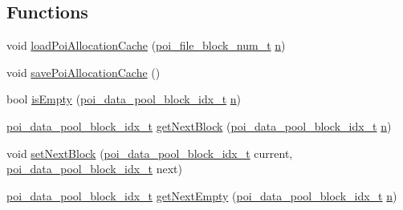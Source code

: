 \subsection*{Functions}
\begin{DoxyCompactItemize}
\item 
void \hyperlink{allocation-block-manager_8h_a2d77f886ffa0a0d025a6a521cc6cf294}{load\-Poi\-Allocation\-Cache} (\hyperlink{file-manager_8h_aef709af8fc6566dcaf55b656bb9f8881}{poi\-\_\-file\-\_\-block\-\_\-num\-\_\-t} \hyperlink{allocation-table-test_8c_a24010dade8ebab3f87a48022772cd975}{n})
\item 
void \hyperlink{allocation-block-manager_8h_aa62c7923af0be489b52b1dcdd7c04e23}{save\-Poi\-Allocation\-Cache} ()
\item 
bool \hyperlink{allocation-block-manager_8h_a4b553c2a61827a60738c9323e6082903}{is\-Empty} (\hyperlink{data-pool-block-manager_8h_a87e19ab8290bcd76be1c7db1e90cc6f6}{poi\-\_\-data\-\_\-pool\-\_\-block\-\_\-idx\-\_\-t} \hyperlink{allocation-table-test_8c_a24010dade8ebab3f87a48022772cd975}{n})
\item 
\hyperlink{data-pool-block-manager_8h_a87e19ab8290bcd76be1c7db1e90cc6f6}{poi\-\_\-data\-\_\-pool\-\_\-block\-\_\-idx\-\_\-t} \hyperlink{allocation-block-manager_8h_a0843a74a7e1cc7c50dbfa521e4ea1cc8}{get\-Next\-Block} (\hyperlink{data-pool-block-manager_8h_a87e19ab8290bcd76be1c7db1e90cc6f6}{poi\-\_\-data\-\_\-pool\-\_\-block\-\_\-idx\-\_\-t} \hyperlink{allocation-table-test_8c_a24010dade8ebab3f87a48022772cd975}{n})
\item 
void \hyperlink{allocation-block-manager_8h_a7387272862663d2af1af9d5c21cddc84}{set\-Next\-Block} (\hyperlink{data-pool-block-manager_8h_a87e19ab8290bcd76be1c7db1e90cc6f6}{poi\-\_\-data\-\_\-pool\-\_\-block\-\_\-idx\-\_\-t} current, \hyperlink{data-pool-block-manager_8h_a87e19ab8290bcd76be1c7db1e90cc6f6}{poi\-\_\-data\-\_\-pool\-\_\-block\-\_\-idx\-\_\-t} next)
\item 
\hyperlink{data-pool-block-manager_8h_a87e19ab8290bcd76be1c7db1e90cc6f6}{poi\-\_\-data\-\_\-pool\-\_\-block\-\_\-idx\-\_\-t} \hyperlink{allocation-block-manager_8h_ab352dc84382d70f0044e92c52165c2cc}{get\-Next\-Empty} (\hyperlink{data-pool-block-manager_8h_a87e19ab8290bcd76be1c7db1e90cc6f6}{poi\-\_\-data\-\_\-pool\-\_\-block\-\_\-idx\-\_\-t} \hyperlink{allocation-table-test_8c_a24010dade8ebab3f87a48022772cd975}{n})
\end{DoxyCompactItemize}


